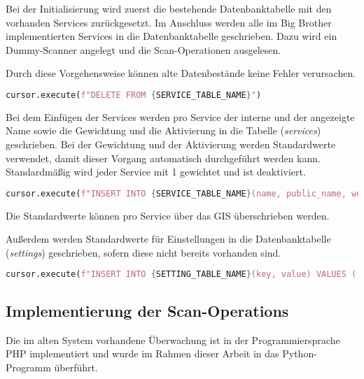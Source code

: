 Bei der Initialisierung wird zuerst die bestehende Datenbanktabelle mit den vorhanden \linebreak Services zurückgesetzt. Im Anschluss werden alle im Big Brother implementierten Services in die Datenbanktabelle geschrieben. Dazu wird ein Dummy-Scanner angelegt und die Scan-Operationen ausgelesen.

Durch diese Vorgehensweise können alte Datenbestände keine Fehler verursachen.

\begin{lstlisting}[language=Python, frame=single, caption={Löschen der Services}, captionpos=b, label={lst:bigbrother-delete-service}]
cursor.execute(f"DELETE FROM {SERVICE_TABLE_NAME}")	
\end{lstlisting}

Bei dem Einfügen der Services werden pro Service der interne und der angezeigte Name sowie die Gewichtung und die Aktivierung in die Tabelle (\textit{services}) geschrieben. Bei der Gewichtung und der Aktivierung werden Standardwerte verwendet, damit dieser Vorgang automatisch durchgeführt werden kann. Standardmäßig wird jeder Service mit 1 gewichtet und ist deaktiviert.

\begin{lstlisting}[language=Python, frame=single, caption={Einfügen eines Services}, captionpos=b, label={lst:bigbrother-create-service}]
cursor.execute(f"INSERT INTO {SERVICE_TABLE_NAME}(name, public_name, weight, active) VALUES ('{name}', '{public_name}', 1, FALSE);")
\end{lstlisting}

Die Standardwerte können pro Service über das GIS überschrieben werden.

Außerdem werden Standardwerte für Einstellungen in die Datenbanktabelle (\textit{settings}) geschrieben, sofern diese nicht bereits vorhanden sind.

\begin{lstlisting}[language=Python, frame=single, caption={Einfügen einer Einstellung}, captionpos=b, label={lst:bigbrother-create-settings}]
cursor.execute(f"INSERT INTO {SETTING_TABLE_NAME}(key, value) VALUES ('{default_value[0]}', '{default_value[1]}') ON CONFLICT (key) DO NOTHING;")
\end{lstlisting}


\subsection{Implementierung der Scan-Operations}
Die im alten System vorhandene Überwachung ist in der Programmiersprache PHP implementiert und wurde im Rahmen dieser Arbeit in das Python-Programm überführt.

